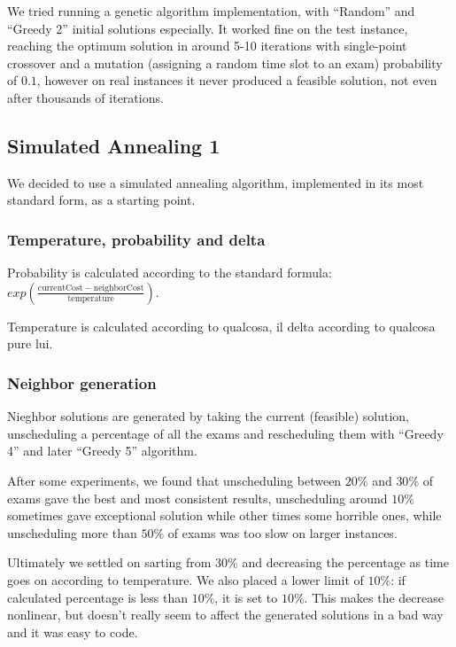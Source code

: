 \documentclass[11pt, a4paper, leqno]{article}
\begin{document}
	We tried running a genetic algorithm implementation, with ``Random'' and ``Greedy 2'' initial solutions especially. It worked fine on the test instance, reaching the optimum solution in around 5-10 iterations with single-point crossover and a mutation (assigning a random time slot to an exam) probability of $0.1$, however on real instances it never produced a feasible solution, not even after thousands of iterations.
	
	\subsection{Simulated Annealing 1}
	\label{neighbors}
	
	We decided to use a simulated annealing algorithm, implemented in its most standard form, as a starting point.
	
	\subsubsection{Temperature, probability and delta}
	
	Probability is calculated according to the standard formula: $exp\left(\frac{\mathrm{currentCost}-\mathrm{neighborCost}}{\mathrm{temperature}}\right)$.
	
	Temperature is calculated according to qualcosa, il delta according to qualcosa pure lui.
	
	\subsubsection{Neighbor generation}
	
	Nieghbor solutions are generated by taking the current (feasible) solution, unscheduling a percentage of all the exams and rescheduling them with ``Greedy 4'' and later ``Greedy 5'' algorithm.
	
	After some experiments, we found that unscheduling between $20\%$ and $30\%$ of exams gave the best and most consistent results, unscheduling around $10\%$ sometimes gave exceptional solution while other times some horrible ones, while unscheduling more than $50\%$ of exams was too slow on larger instances.
	
	Ultimately we settled on sarting from $30\%$ and decreasing the percentage as time goes on according to temperature. We also placed a lower limit of $10\%$: if calculated percentage is less than $10\%$, it is set to $10\%$. This makes the decrease nonlinear, but doesn't really seem to affect the generated solutions in a bad way and it was easy to code.
	
\end{document}
